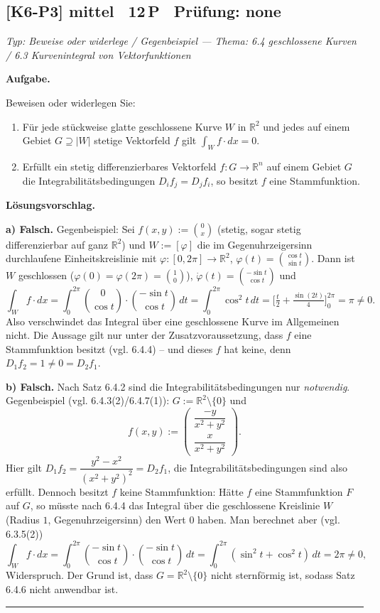\documentclass[a4paper,11pt]{article}
\begin{document}
\subsection*{[K6-P3] \normalfont mittel \textbullet\ 12\,P \textbullet\ Pr\"ufung: none}
\textit{Typ: Beweise oder widerlege / Gegenbeispiel  ---  Thema: 6.4 geschlossene Kurven / 6.3 Kurvenintegral von Vektorfunktionen}\par\smallskip
\textbf{Aufgabe.}\par
Beweisen oder widerlegen Sie:
\begin{enumerate}[label=\alph*)]
\item Für jede stückweise glatte geschlossene Kurve $W$ in $\mathbb{R}^2$ und jedes auf einem Gebiet $G\supseteq|W|$ stetige Vektorfeld $f$ gilt $\displaystyle\int_W f\cdot dx=0$.
\item Erfüllt ein stetig differenzierbares Vektorfeld $f:G\to\mathbb{R}^n$ auf einem Gebiet $G$ die Integrabilitätsbedingungen $D_i f_j=D_j f_i$, so besitzt $f$ eine Stammfunktion.
\end{enumerate}\par\smallskip
\textbf{L\"osungsvorschlag.}\par
\textbf{a) Falsch.} Gegenbeispiel: Sei $f(x,y):=\binom{0}{x}$ (stetig, sogar stetig differenzierbar auf ganz $\mathbb{R}^2$) und $W:=[\varphi]$ die im Gegenuhrzeigersinn durchlaufene Einheitskreislinie mit $\varphi:[0,2\pi]\to\mathbb{R}^2$, $\varphi(t)=\binom{\cos t}{\sin t}$. Dann ist $W$ geschlossen ($\varphi(0)=\varphi(2\pi)=\binom10$), $\dot\varphi(t)=\binom{-\sin t}{\cos t}$ und
\[\int_W f\cdot dx=\int_0^{2\pi}\binom{0}{\cos t}\cdot\binom{-\sin t}{\cos t}\,dt=\int_0^{2\pi}\cos^{2}t\,dt=\Big[\tfrac{t}{2}+\tfrac{\sin(2t)}{4}\Big]_0^{2\pi}=\pi\neq 0.\]
Also verschwindet das Integral über eine geschlossene Kurve im Allgemeinen nicht. Die Aussage gilt nur unter der Zusatzvoraussetzung, dass $f$ eine Stammfunktion besitzt (vgl. 6.4.4) – und dieses $f$ hat keine, denn $D_1 f_2=1\neq 0=D_2 f_1$.

\textbf{b) Falsch.} Nach Satz 6.4.2 sind die Integrabilitätsbedingungen nur \emph{notwendig}. Gegenbeispiel (vgl. 6.4.3(2)/6.4.7(1)): $G:=\mathbb{R}^2\setminus\{0\}$ und
\[f(x,y):=\begin{pmatrix}\dfrac{-y}{x^{2}+y^{2}}\\[6pt]\dfrac{x}{x^{2}+y^{2}}\end{pmatrix}.\]
Hier gilt $D_1 f_2=\dfrac{y^{2}-x^{2}}{(x^{2}+y^{2})^{2}}=D_2 f_1$, die Integrabilitätsbedingungen sind also erfüllt. Dennoch besitzt $f$ keine Stammfunktion: Hätte $f$ eine Stammfunktion $F$ auf $G$, so müsste nach 6.4.4 das Integral über die geschlossene Kreislinie $W$ (Radius $1$, Gegenuhrzeigersinn) den Wert $0$ haben. Man berechnet aber (vgl. 6.3.5(2))
\[\int_W f\cdot dx=\int_0^{2\pi}\binom{-\sin t}{\cos t}\cdot\binom{-\sin t}{\cos t}\,dt=\int_0^{2\pi}(\sin^2 t+\cos^2 t)\,dt=2\pi\neq 0,\]
Widerspruch. Der Grund ist, dass $G=\mathbb{R}^2\setminus\{0\}$ nicht sternförmig ist, sodass Satz 6.4.6 nicht anwendbar ist.\par\bigskip\hrule\bigskip
\end{document}
